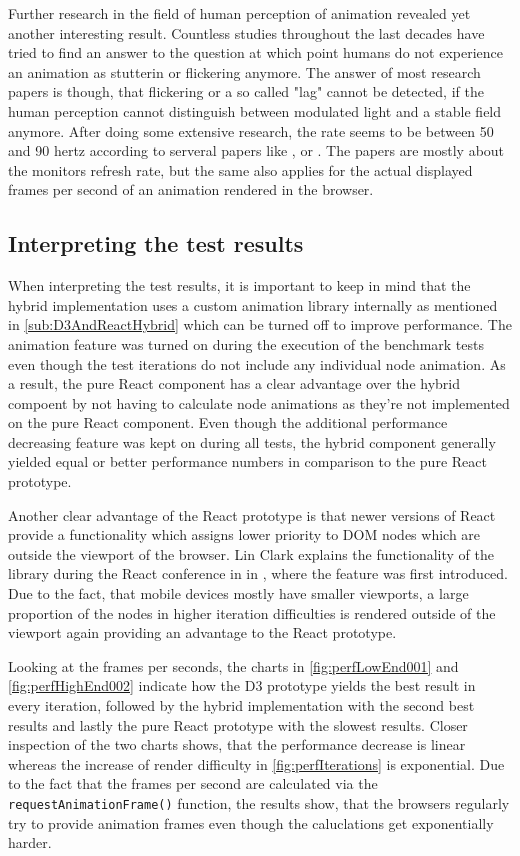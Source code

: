 Further research in the field of human perception of animation revealed yet another interesting result. Countless studies  throughout the last decades have tried to find an answer to the question at which point humans do not experience an animation as stutterin or flickering anymore. The answer of most research papers is though, that flickering or a so called "lag" cannot be detected, if the human perception cannot distinguish between modulated light and a stable field anymore. After doing some extensive research, the rate seems to be between 50 and 90 hertz according to serveral papers like \cite{6375944}, \cite{farrell1987predicting} or \cite{stereoscopicFlickerArticle}. The papers are mostly about the monitors refresh rate, but the same also applies for the actual displayed frames per second of an animation rendered in the browser.

\subsection{Interpreting the test results}

When interpreting the test results, it is important to keep in mind that the hybrid implementation uses a custom animation library internally as mentioned in \ref{sub:D3AndReactHybrid} which can be turned off to improve performance. The animation feature was turned on during the execution of the benchmark tests even though the test iterations do not include any individual node animation. As a result, the pure React component has a clear advantage over the hybrid compoent by not having to calculate node animations as they're not implemented on the pure React component. Even though the additional performance decreasing feature was kept on during all tests, the hybrid component generally yielded equal or better performance numbers in comparison to the pure React prototype.

Another clear advantage of the React prototype is that newer versions of React provide a functionality which assigns lower priority to DOM nodes which are outside the viewport of the browser. Lin Clark explains the functionality of the library during the React conference in in \cite{ReactReconcliliationVideo}, where the feature was first introduced. Due to the fact, that mobile devices mostly have smaller viewports, a large proportion of the nodes in higher iteration difficulties is rendered outside of the viewport again providing an advantage to the React prototype.

Looking at the frames per seconds, the charts in \ref{fig:perfLowEnd001} and \ref{fig:perfHighEnd002} indicate how the D3 prototype yields the best result in every iteration, followed by the hybrid implementation with the second best results and lastly the pure React prototype with the slowest results. Closer inspection of the two charts shows, that the performance decrease is linear whereas the increase of render difficulty in \ref{fig:perfIterations} is exponential. Due to the fact that the frames per second are calculated via the \texttt{requestAnimationFrame()} function, the results show, that the browsers regularly try to provide animation frames even though the caluclations get exponentially harder.

